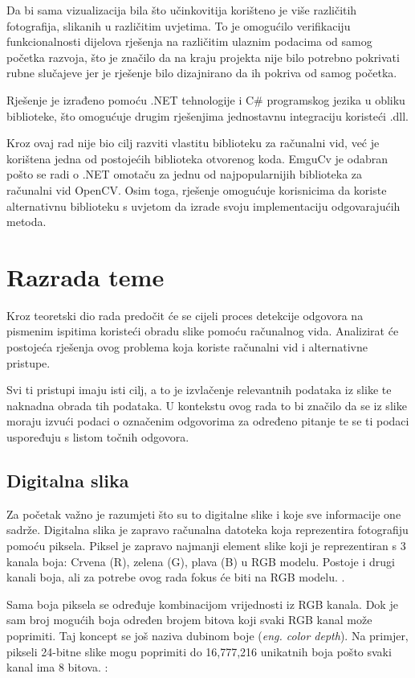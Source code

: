 \documentclass{foi}
\begin{document}
Da bi sama vizualizacija bila što učinkovitija korišteno je više različitih fotografija, slikanih u različitim uvjetima. To je omogućilo verifikaciju funkcionalnosti dijelova rješenja na različitim ulaznim podacima od samog početka razvoja, što je značilo da na kraju projekta nije bilo potrebno pokrivati rubne slučajeve jer je rješenje bilo dizajnirano da ih pokriva od samog početka.

Rješenje je izrađeno pomoću .NET tehnologije i C\# programskog jezika u obliku biblioteke, što omogućuje drugim rješenjima jednostavnu integraciju koristeći .dll. 

Kroz ovaj rad nije bio cilj razviti vlastitu biblioteku za računalni vid, već je korištena jedna od postojećih biblioteka otvorenog koda. EmguCv je odabran pošto se radi o .NET omotaču za jednu od najpopularnijih biblioteka za računalni vid OpenCV. Osim toga, rješenje omogućuje korisnicima da koriste alternativnu biblioteku s uvjetom da izrade svoju implementaciju odgovarajućih metoda.

\chapter{Razrada teme}

Kroz teoretski dio rada predočit će se cijeli proces detekcije odgovora na pismenim ispitima koristeći obradu slike pomoću računalnog vida. Analizirat će postojeća rješenja ovog problema koja koriste računalni vid i alternativne pristupe. 

Svi ti pristupi imaju isti cilj, a to je izvlačenje relevantnih podataka iz slike te naknadna obrada tih podataka. U kontekstu ovog rada to bi značilo da se iz slike moraju izvući podaci o označenim odgovorima za određeno pitanje te se ti podaci uspoređuju s listom točnih odgovora. 

\section{Digitalna slika }

Za početak važno je razumjeti što su to digitalne slike i koje sve informacije one sadrže. Digitalna slika je zapravo računalna datoteka koja reprezentira fotografiju pomoću piksela. Piksel je zapravo najmanji element slike koji je reprezentiran s 3 kanala boja: Crvena (R), zelena (G), plava (B) u RGB modelu. Postoje i drugi kanali boja, ali za potrebe ovog rada fokus će biti na RGB modelu. \cite{DigitalnaSlika}.

Sama boja piksela se određuje kombinacijom vrijednosti iz RGB kanala. Dok je sam broj mogućih boja određen brojem bitova koji svaki RGB kanal može poprimiti. Taj koncept se još naziva dubinom boje (\textit{eng. color depth}). Na primjer, pikseli 24-bitne slike mogu poprimiti do 16,777,216 unikatnih boja pošto svaki kanal ima 8 bitova. \cite{DigitalnaSlika}:
\end{document}
